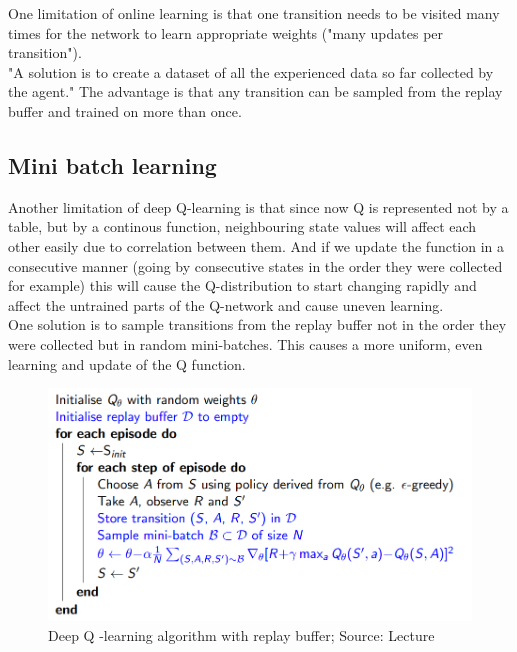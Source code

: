 One limitation of online learning is that one transition needs to be visited many times for the network to learn appropriate weights ("many updates per transition"). \\

"A solution is to create a dataset of all the experienced data so far collected by the agent." The 
advantage is that any transition can be sampled from the replay buffer and trained on more than once. 

\subsection{Mini batch learning }

Another limitation of deep Q-learning is that since now Q is represented not by a table, but by a continous function, neighbouring state values will affect each other easily due to correlation between them. And if 
we update the function in a consecutive manner (going by consecutive states in the order they were collected for example) this will cause the  Q-distribution to start changing rapidly and affect the untrained parts of the Q-network and cause uneven learning. \\

One solution is to sample transitions from the replay buffer not in the order they were collected but in random mini-batches. This causes a more uniform, even learning and update of the Q function.  

\begin{figure}[h!]
  \centering
  \includegraphics[scale=0.5]{figures/replay_buffer.PNG}
  \caption{Deep Q -learning algorithm with replay buffer; Source: Lecture}
  \label{fig:replay_buffer}
\end{figure}

